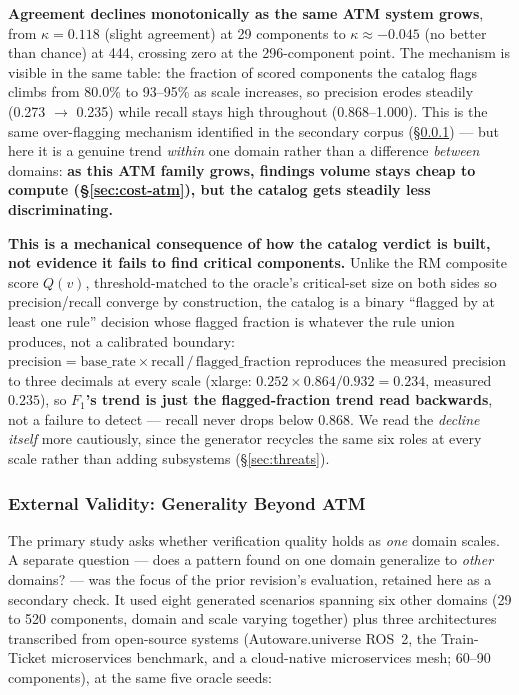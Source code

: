 \documentclass[sigconf,9pt]{acmart}
\begin{document}
\textbf{Agreement declines monotonically as the same ATM system grows}, from $\kappa = 0.118$
(slight agreement) at 29 components to $\kappa \approx -0.045$ (no better than chance) at 444,
crossing zero at the 296-component point. The mechanism is visible in the same table: the fraction
of scored components the catalog flags climbs from 80.0\% to 93--95\% as scale increases, so
precision erodes steadily (0.273 $\rightarrow$ 0.235) while recall stays high throughout
(0.868--1.000). This is the same over-flagging mechanism identified in the secondary corpus
(\S\ref{sec:external-validity}) --- but here it is a genuine trend \emph{within} one domain rather
than a difference \emph{between} domains: \textbf{as this ATM family grows, findings volume stays
cheap to compute (\S\ref{sec:cost-atm}), but the catalog gets steadily less discriminating.}

\textbf{This is a mechanical consequence of how the catalog verdict is built, not evidence it
fails to find critical components.} Unlike the RM composite score $Q(v)$, threshold-matched to
the oracle's critical-set size on both sides so precision/recall converge by construction, the
catalog is a binary ``flagged by at least one rule'' decision whose flagged fraction is whatever
the rule union produces, not a calibrated boundary:
$\text{precision} = \text{base\_rate} \times \text{recall} \, / \, \text{flagged\_fraction}$
reproduces the measured precision to three decimals at every scale (xlarge:
$0.252 \times 0.864 / 0.932 = 0.234$, measured $0.235$), so \textbf{$F_1$'s trend is just the
flagged-fraction trend read backwards}, not a failure to detect --- recall never drops below 0.868.
We read the \emph{decline itself} more cautiously, since the generator recycles the same six roles
at every scale rather than adding subsystems (\S\ref{sec:threats}).

\subsubsection{External Validity: Generality Beyond ATM}
\label{sec:external-validity}

The primary study asks whether verification quality holds as \emph{one} domain scales. A separate
question --- does a pattern found on one domain generalize to \emph{other} domains? --- was the
focus of the prior revision's evaluation, retained here as a secondary check. It used eight
generated scenarios spanning six other domains (29 to 520 components, domain and scale varying
together) plus three architectures transcribed from open-source systems (Autoware.universe ROS~2,
the Train-Ticket microservices benchmark, and a cloud-native microservices mesh; 60--90
components), at the same five oracle seeds:
\end{document}
